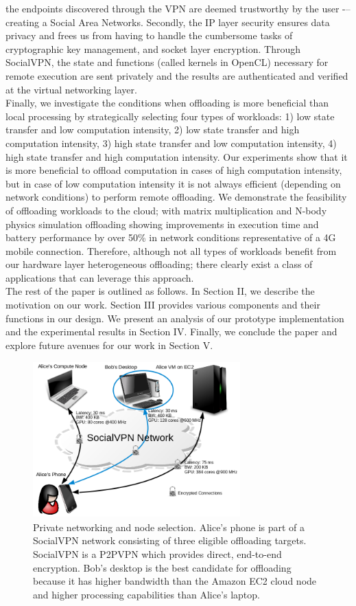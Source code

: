 \documentclass[10pt, conference, compsocconf]{IEEEtran}
\begin{document}
the endpoints discovered through the VPN are deemed trustworthy by the user -– 
creating a Social Area Networks.
%
Secondly, the IP layer security ensures data privacy and frees us from 
having to handle the cumbersome tasks of cryptographic key management, and 
socket layer encryption.
%
Through SocialVPN, the state and functions (called kernels in OpenCL) 
necessary for remote execution are sent privately and the results are 
authenticated and verified at the virtual networking layer.\\
%
\indent Finally, we investigate the conditions when offloading is more beneficial 
than local processing by strategically selecting four types of workloads: 
1) low state transfer and low computation intensity, 2) low state transfer 
and high computation intensity, 3) high state transfer and low computation 
intensity, 4) high state transfer and high computation intensity.
%
Our experiments show that it is more beneficial to offload computation in 
cases of high computation intensity, but in case of low computation 
intensity it is not always efficient (depending on network conditions) to 
perform remote offloading.
%
We demonstrate the feasibility of offloading workloads to the cloud; with 
matrix multiplication and N-body physics simulation offloading showing 
improvements in execution time and battery performance by over 50\% in network 
conditions representative of a 4G mobile connection.
%
Therefore, although not all types of workloads benefit from our hardware layer
heterogeneous offloading; there clearly exist a class of applications that can
leverage this approach.\\
%
\indent The rest of the paper is outlined as follows.
%
In Section II, we describe the motivation on our work.
%
Section III provides various components and their functions in our
design.
%
We present an analysis of our prototype implementation and the
experimental results in Section IV.
%
Finally, we conclude the paper and explore future avenues for our work
in Section V.
%
\begin{figure}
\centering
\includegraphics[height=6.0cm, width=8.0cm]{Figure/motivation}
\caption{Private networking and node selection.
Alice's phone is part of a SocialVPN network consisting of three 
eligible offloading targets.
%
SocialVPN is a P2PVPN which provides direct, end-to-end encryption.
%
Bob's desktop is the best candidate for offloading because it has higher
bandwidth than the Amazon EC2 cloud node and higher processing capabilities 
than Alice's laptop.
}
\end{figure}
%
\end{document}
